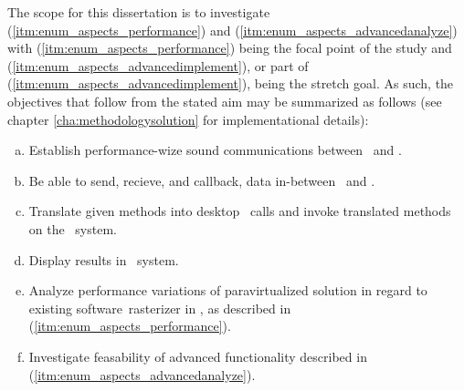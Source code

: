 The scope for this dissertation is to investigate (\ref{itm:enum_aspects_performance}) and (\ref{itm:enum_aspects_advancedanalyze}) with (\ref{itm:enum_aspects_performance}) being the focal point of the study and (\ref{itm:enum_aspects_advancedimplement}), or part of (\ref{itm:enum_aspects_advancedimplement}), being the stretch goal.
As such, the objectives that follow from the stated aim may be summarized as follows (see chapter \ref{cha:methodologysolution} for implementational details):

\newcommand*\objective[1]{\item}
\begin{multicols}{2}
\begin{enumerate}[(a)]
	\objective{1} Establish performance-wize sound communications between \dvttermhost\ and \dvttermtarget .
	\objective{2} Be able to send, recieve, and callback, data in-between \dvttermhost\ and \dvttermtarget .
	\objective{3} Translate given methods into desktop \dvttermapi\ calls and invoke translated methods on the \dvttermhost\ system.
	\objective{4} Display results in \dvttermtarget\ system.
	\objective{5} Analyze performance variations of paravirtualized solution in regard to existing software~rasterizer in \dvttermsimics , as described in (\ref{itm:enum_aspects_performance}).
	\objective{6} Investigate feasability of advanced functionality described in (\ref{itm:enum_aspects_advancedanalyze}).
\end{enumerate}
\end{multicols}
